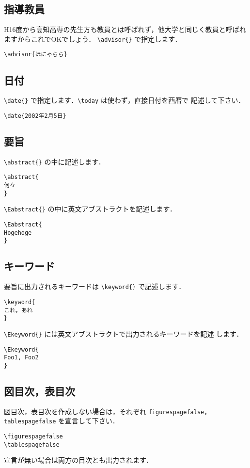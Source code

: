 \documentclass[mingoth]{knct-paper}		%
\begin{document}
  \subsection{指導教員}
  H16度から高知高専の先生方も教員とは呼ばれず，他大学と同じく教員と呼ばれますからこれでOKでしょう．
  \verb|\advisor{}| で指定します．
\begin{verbatim}
\advisor{ほにゃらら}
\end{verbatim}

  \subsection{日付}
  \verb|\date{}| で指定します．\verb|\today| は使わず，直接日付を西暦で
  記述して下さい．
\begin{verbatim}
\date{2002年2月5日}
\end{verbatim}

  \subsection{要旨}
  \verb|\abstract{}| の中に記述します．
\begin{verbatim}
\abstract{
何々
}
\end{verbatim}

  \verb|\Eabstract{}| の中に英文アブストラクトを記述します．
\begin{verbatim}
\Eabstract{
Hogehoge
}
\end{verbatim}

  \subsection{キーワード}
  要旨に出力されるキーワードは \verb|\keyword{}| で記述します．
\begin{verbatim}
\keyword{
これ，あれ
}
\end{verbatim}

  \verb|\Ekeyword{}| には英文アブストラクトで出力されるキーワードを記述
  します．
\begin{verbatim}
\Ekeyword{
Foo1, Foo2
}
\end{verbatim}
  
  \subsection{図目次，表目次}
  図目次，表目次を作成しない場合は，それぞれ \verb|figurespagefalse|，
  \verb|tablespagefalse| を宣言して下さい．
\begin{verbatim}
\figurespagefalse
\tablespagefalse
\end{verbatim}
  宣言が無い場合は両方の目次とも出力されます．
\end{document}
